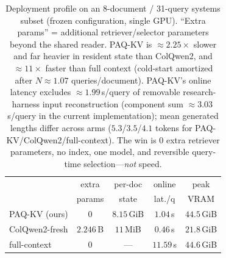 \documentclass[letterpaper]{article} %
\newcommand{\paqc}{\textsc{PAQ-KV}}
\begin{document}
\begin{table}[t]
\centering\small
\setlength{\tabcolsep}{4pt}%
\begin{tabular}{lcccc}
\toprule
 & extra & per-doc & online & peak \\
 & params & state & lat./q & VRAM \\
\midrule
\paqc{} (ours)   & $0$        & $8.15$\,GiB & $1.04$\,s  & $44.5$\,GiB \\
ColQwen2-fresh   & $2.246$\,B & $11$\,MiB   & $0.46$\,s  & $21.8$\,GiB \\
full-context     & $0$        & ---         & $11.59$\,s & $44.6$\,GiB \\
\bottomrule
\end{tabular}
\caption{Deployment profile on an 8-document / 31-query systems subset (frozen configuration, single GPU). ``Extra params'' = additional retriever/selector parameters beyond the shared reader. \paqc{} is ${\approx}2.25\times$ slower and far heavier in resident state than ColQwen2, and ${\approx}11\times$ faster than full context (cold-start amortized after $N{\approx}1.07$ queries/document). \paqc{}'s online latency excludes ${\approx}1.99$\,s/query of removable research-harness input reconstruction (component sum ${\approx}3.03$\,s/query in the current implementation); mean generated lengths differ across arms ($5.3$/$3.5$/$4.1$ tokens for \paqc{}/ColQwen2/full-context). The win is $0$ extra retriever parameters, no index, one model, and reversible query-time selection---\emph{not} speed.}
\label{tab:systems}
\end{table}
\end{document}
